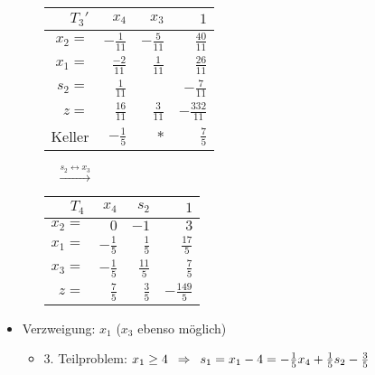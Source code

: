 \begin{beispiel}
\begin{itemize}[leftmargin=*]
\begin{itemize}
			\begin{center}
				\begin{tabular}{r|rr|r}
					$T_3'$ & $x_4$ & $x_3$ & $1$ \\ \hline
					$x_2 = $ & $-\frac{1}{11}$ & $-\frac{5}{11}$ & $\frac{40}{11}$ \\
					$x_1 = $ & $\frac{-2}{11}$ & $\frac{1}{11}$ & $\frac{26}{11}$ \\
					$s_2 = $ & $\frac{1}{11}$ & \fbox{$\frac{5}{11}$} & $-\frac{7}{11}$ \\ \hline
					$z = $   & $\frac{16}{11}$ & $\frac{3}{11}$ & $-\frac{332}{11}$ \\ \hline
					Keller & $-\frac{1}{5}$ & $\ast$ & $\frac{7}{5}$
				\end{tabular}	
				$\quad \overset{s_2 \leftrightarrow x_3}{\longrightarrow} \quad$		
				\begin{tabular}{r|rr|r}
					$T_4$ & $x_4$ & $s_2$ & $1$ \\ \hline
					$x_2 = $ & $0$ & $-1$ & $3$ \\
					$x_1 = $ & $-\frac{1}{5}$ & $\frac{1}{5}$ & $\frac{17}{5}$ \\
					$x_3 = $ & $-\frac{1}{5}$ & $\frac{11}{5}$ & $\frac{7}{5}$ \\ \hline
					$z = $   & $\frac{7}{5}$ & $\frac{3}{5}$ & $-\frac{149}{5}$
				\end{tabular}
			\end{center}
		\end{itemize}
		\item Verzweigung: $x_1$ ($x_3$ ebenso möglich)
		\begin{itemize}
			\item 3. Teilproblem: $x_1 \ge 4 \enskip \Rightarrow \enskip s_1 = x_1 - 4 = -\frac{1}{5}x_4 + \frac{1}{5} s_2 - \frac{3}{5}$
			

\end{itemize}
\end{itemize}
\end{beispiel}
